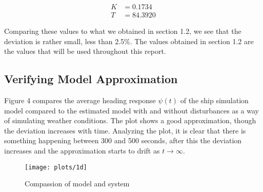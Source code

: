 \begin{align*}
K  &= 0.1734\\
T &= 84.3920
\end{align*}

Comparing these values to what we obtained in section 1.2, we see that the deviation is rather small, less than 2.5\%. The values obtained in section 1.2 are the values that will be used throughout this report.

\subsection{Verifying Model Approximation}

Figure 4 compares the average heading response $\psi(t)$ of the ship simulation model compared to the estimated model with and without disturbances as a way of simulating weather conditions. The plot shows a good approximation, though the deviation increases with time. Analyzing the plot, it is clear that there is something happening between 300 and 500 seconds, after this the deviation increases and the approximation starts to drift as $t \to \infty $.





\begin{figure}[!htb]
    \caption{Compassion  of model and system}
    \centering
    \centerline{\texttt{[image: plots/1d]}}
    \label{plot:1d}
\end{figure}
